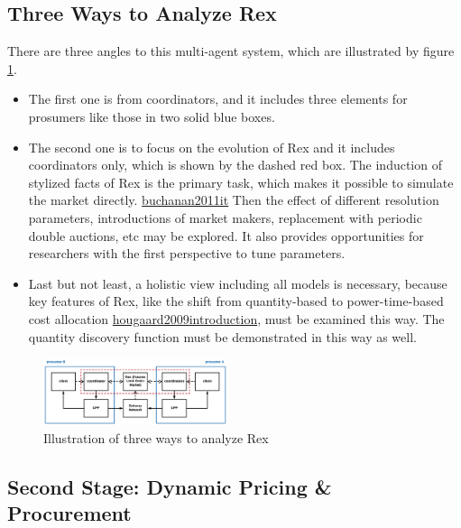 \documentclass[letterpaper,8pt,twocolumn,twoside,]{pinp}
\providecommand{\tightlist}{%
  \setlength{\itemsep}{0pt}\setlength{\parskip}{0pt}}
\begin{document}
\hypertarget{three-ways-to-analyze-rex}{%
\subsection{Three Ways to Analyze Rex}\label{three-ways-to-analyze-rex}}

\label{three}

There are three angles to this multi-agent system, which are illustrated
by figure \ref{2}.

\begin{itemize}
\tightlist
\item
  The first one is from coordinators, and it includes three elements for
  prosumers like those in two solid blue boxes.
\item
  The second one is to focus on the evolution of Rex and it includes
  coordinators only, which is shown by the dashed red box. The induction
  of stylized facts of Rex is the primary task, which makes it possible
  to simulate the market directly.
  \protect\hyperlink{reference}{buchanan2011it} Then the effect of
  different resolution parameters, introductions of market makers,
  replacement with periodic double auctions, etc may be explored. It
  also provides opportunities for researchers with the first perspective
  to tune parameters.
\item
  Last but not least, a holistic view including all models is necessary,
  because key features of Rex, like the shift from quantity-based to
  power-time-based cost allocation
  \protect\hyperlink{reference}{hougaard2009introduction}, must be
  examined this way. The quantity discovery function must be
  demonstrated in this way as well.
\end{itemize}

\begin{figure}
\begin{center}
  \includegraphics[width=0.48\textwidth]{../../../images/4-10.png}
\end{center}
\caption{Illustration of three ways to analyze Rex}
\label{2}
\end{figure}

\hypertarget{second-stage-dynamic-pricing-procurement}{%
\subsection{Second Stage: Dynamic Pricing \&
Procurement}\label{second-stage-dynamic-pricing-procurement}}
\end{document}
